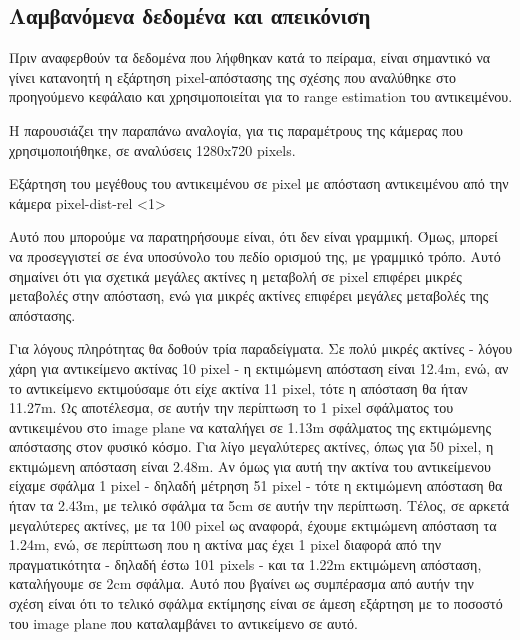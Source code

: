 
\subsection{Λαμβανόμενα δεδομένα και απεικόνιση} \label{sec:expe-single-3d}

Πριν αναφερθούν τα δεδομένα που λήφθηκαν κατά το πείραμα, είναι σημαντικό να γίνει κατανοητή η εξάρτηση pixel-απόστασης της σχέσης  που αναλύθηκε στο προηγούμενο κεφάλαιο και χρησιμοποιείται για το range estimation του αντικειμένου.

Η  παρουσιάζει την παραπάνω αναλογία, για τις παραμέτρους της κάμερας που χρησιμοποιήθηκε, σε αναλύσεις 1280x720 pixels.

{Εξάρτηση του μεγέθους του αντικειμένου σε pixel με απόσταση αντικειμένου από την κάμερα}%
{pixel-dist-rel}%
<1>

Αυτό που μπορούμε να παρατηρήσουμε είναι, ότι δεν είναι γραμμική. Όμως, μπορεί να προσεγγιστεί σε ένα υποσύνολο του πεδίο ορισμού της, με γραμμικό τρόπο. Αυτό σημαίνει ότι για σχετικά μεγάλες ακτίνες η μεταβολή σε pixel επιφέρει μικρές με\-τα\-βο\-λές στην απόσταση, ενώ για μικρές ακτίνες επιφέρει μεγάλες μεταβολές της απόστασης. 

Για λόγους πληρότητας θα δοθούν τρία παραδείγματα. Σε πολύ μικρές ακτίνες - λόγου χάρη για αντικείμενο ακτίνας 10 pixel - η εκτιμώμενη απόσταση είναι 12.4m, ενώ, αν το αντικείμενο εκτιμούσαμε ότι είχε ακτίνα 11 pixel, τότε η απόσταση θα ήταν 11.27m. Ως αποτέλεσμα, σε αυτήν την περίπτωση το 1 pixel σφάλματος του αντικειμένου στο image plane να καταλήγει σε 1.13m σφάλματος της εκτιμώμενης απόστασης στον φυσικό κόσμο. Για λίγο μεγαλύτερες ακτίνες, όπως για 50 pixel, η εκτιμώμενη απόσταση είναι 2.48m. Αν όμως για αυτή την ακτίνα του αντικείμενου είχαμε σφάλμα 1 pixel - δηλαδή μέτρηση 51 pixel - τότε η εκτιμώμενη απόσταση θα ήταν τα 2.43m, με τελικό σφάλμα τα 5cm σε αυτήν την περίπτωση. Τέλος, σε αρκετά μεγαλύτερες ακτίνες, με τα 100 pixel ως αναφορά, έχουμε εκτιμώμενη α\-πό\-στα\-ση τα 1.24m, ενώ, σε περίπτωση που η ακτίνα μας έχει 1 pixel διαφορά από την πραγματικότητα - δηλαδή έστω 101 pixels - και τα 1.22m εκτιμώμενη απόσταση, καταλήγουμε σε 2cm σφάλμα. Αυτό που βγαίνει ως συμπέρασμα από αυτήν την σχέση είναι ότι το τελικό σφάλμα εκτίμησης είναι σε άμεση εξάρτηση με το ποσοστό του image plane που καταλαμβάνει το αντικείμενο σε αυτό. 

